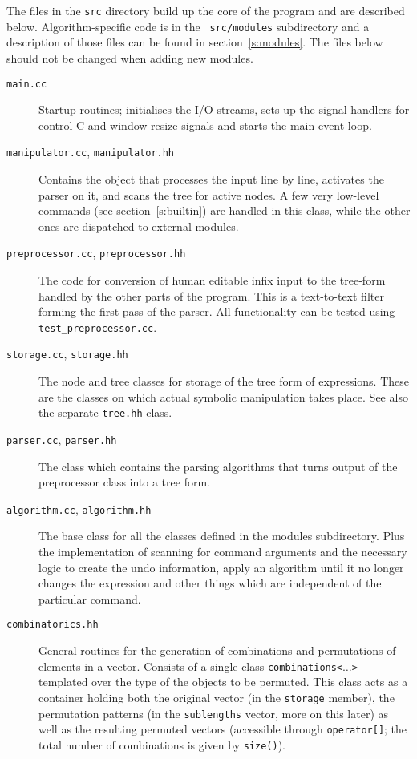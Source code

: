 \documentclass[11pt]{article}
\numberwithin{equation}{section}
\begin{document}
The files in the {\tt src} directory build up the core of the program
and are described below. Algorithm-specific code is in the {\tt
src/modules} subdirectory and a description of those files can be
found in section~\ref{s:modules}. The files below should not be
changed when adding new modules.
\begin{description}
\item[{\tt main.cc}] Startup routines; initialises the I/O streams,
sets up the signal handlers for control-C and window resize signals
and starts the main event loop.

\item[{\tt manipulator.cc}, {\tt manipulator.hh}] Contains the object
  that processes the input line by line, activates the parser on it,
  and scans the tree for active nodes. A few very low-level commands
  (see section~\ref{s:builtin}) are handled in this class, while the
  other ones are dispatched to external modules.

\item[{\tt preprocessor.cc}, {\tt preprocessor.hh}] The code for
conversion of human editable infix input to the tree-form handled by
the other parts of the program. This is a text-to-text filter forming
the first pass of the parser. All functionality can be tested using
\verb|test_preprocessor.cc|.

\item[{\tt storage.cc}, {\tt storage.hh}] The node and tree classes
for storage of the tree form of expressions. These are the classes on 
which actual symbolic manipulation takes place. See also the separate
\verb|tree.hh| class.

\item[{\tt parser.cc}, {\tt parser.hh}] The class which contains the
parsing algorithms that turns output of the preprocessor class into a
tree form.

\item[{\tt algorithm.cc}, {\tt algorithm.hh}] The base class for all
the classes defined in the modules subdirectory. Plus the
implementation of scanning for command arguments and the necessary
logic to create the undo information, apply an algorithm until it no
longer changes the expression and other things which are independent
of the particular command.

\item[{\tt combinatorics.hh}] General routines for the generation of
combinations and permutations of elements in a vector. Consists
of a single class {\tt combinations<$\ldots$>} templated over the
type of the objects to be permuted. This class acts as a container
holding both the original vector (in the {\tt storage} member), the
permutation patterns (in the {\tt sublengths} vector, more on this
later) as well as the resulting permuted vectors (accessible through 
{\tt operator[]}; the total number of combinations is given by
{\tt size()}).
\end{description}
\end{document}
